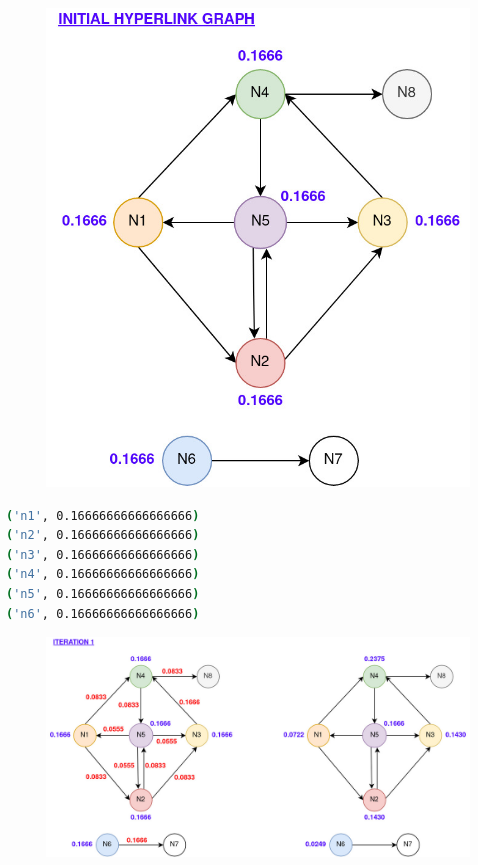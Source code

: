 \documentclass[11pt,a4paper]{article}
\begin{document}
\begin{figure}[H]
    \centering
    \includegraphics[scale=0.35]{imgs/initial.jpg}
\end{figure}
\begin{lstlisting}[language=bash,title={Initial PageRank}]
('n1', 0.16666666666666666)
('n2', 0.16666666666666666)
('n3', 0.16666666666666666)
('n4', 0.16666666666666666)
('n5', 0.16666666666666666)
('n6', 0.16666666666666666)
\end{lstlisting}
\begin{figure}[H]
    \centering
    \includegraphics[scale=0.26]{imgs/iteration-1.jpg}
\end{figure}
\end{document}
